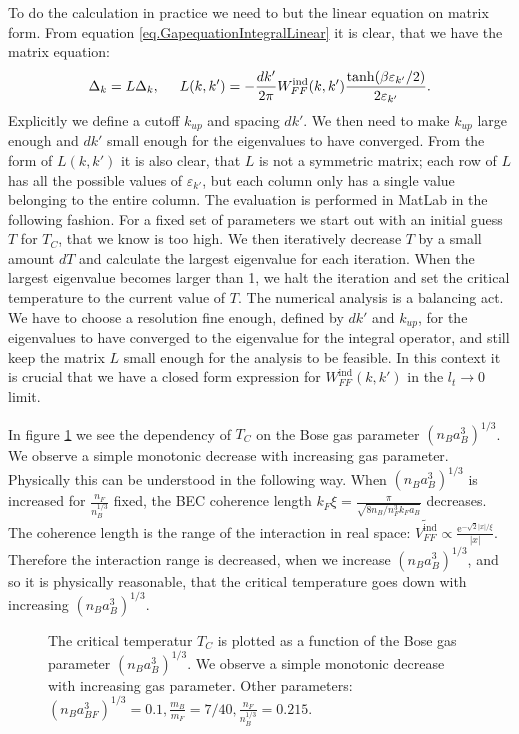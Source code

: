 To do the calculation in practice we need to but the linear equation on matrix form. From equation \eqref{eq.GapequationIntegralLinear} it is clear, that we have the matrix equation:
\begin{equation}
\Delta_k = L \Delta_k, \hspace{0.5cm} L(k,k') = -\frac{dk'}{2\pi} W^\text{ind}_{FF}(k,k')\frac{\tanh(\beta \varepsilon_{k'}/2)}{2\varepsilon_{k'}}. 
\label{eq.Gapmatrixequation}
\end{equation}
Explicitly we define a cutoff $k_{up}$ and spacing $dk'$. We then need to make $k_{up}$ large enough and $dk'$ small enough for the eigenvalues to have converged. From the form of $L(k,k')$ it is also clear, that $L$ is not a symmetric matrix; each row of $L$ has all the possible values of $\varepsilon_{k'}$, but each column only has a single value belonging to the entire column. The evaluation is performed in MatLab in the following fashion. For a fixed set of parameters we start out with an initial guess $T$ for $T_C$, that we know is too high. We then iteratively decrease $T$ by a small amount $dT$ and calculate the largest eigenvalue for each iteration. When the largest eigenvalue becomes larger than 1, we halt the iteration and set the critical temperature to the current value of $T$. The numerical analysis is a balancing act. We have to choose a resolution fine enough, defined by $dk'$ and $k_{up}$, for the eigenvalues to have converged to the eigenvalue for the integral operator, and still keep the matrix $L$ small enough for the analysis to be feasible. In this context it is crucial that we have a closed form expression for $W^\text{ind}_{FF}(k,k')$ in the $l_t \to 0$ limit. 

In figure \ref{fig.TCrB} we see the dependency of $T_C$ on the Bose gas parameter $(n_Ba_B^3)^{1/3}$. We observe a simple monotonic decrease with increasing gas parameter. Physically this can be understood in the following way. When $(n_Ba_B^3)^{1/3}$ is increased for $\frac{n_F}{n_B^{1/3}}$ fixed, the BEC coherence length $k_F\xi = \frac{\pi}{\sqrt{8 n_B/n_F^3 k_Fa_B}}$ decreases. The coherence length is the range of the interaction in real space: $\tilde{V_{FF}^{\text{ind}}} \propto \frac{ \text{e}^{ -\sqrt{2}|x|/\xi } } {|x|}$. Therefore the interaction range is decreased, when we increase $(n_Ba_B^3)^{1/3}$, and so it is physically reasonable, that the critical temperature goes down with increasing $(n_Ba_B^3)^{1/3}$.

\begin{figure} 
\begin{center}  
  
\caption{The critical temperatur $T_C$ is plotted as a function of the Bose gas parameter $(n_Ba_B^3)^{1/3}$. We observe a simple monotonic decrease with increasing gas parameter. Other parameters: $(n_Ba_{BF}^3)^{1/3} = 0.1, \frac{m_B}{m_F} = 7/40, \frac{n_F}{n_B^{1/3}} = 0.215$. }  
\label{fig.TCrB}  
\end{center}    
\end{figure}

